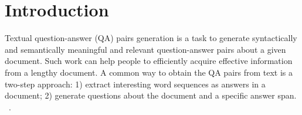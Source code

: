 \section{Introduction}
\label{sec:intro}

Textual question-answer (QA) pairs generation is a task to generate 
syntactically and semantically meaningful and relevant question-answer 
pairs about a given document. 
Such work can help people to 
efficiently acquire effective information from a lengthy document.
A common way to obtain the QA pairs from text is a two-step approach: 
1) extract interesting word sequences as answers in a document;
2) generate questions about the document and a specific answer span.
~\cite{subramanian2017neural,lovenia2018automatic,kumar2019paraqg,DBLP:journals/corr/abs-1906-02622}.




